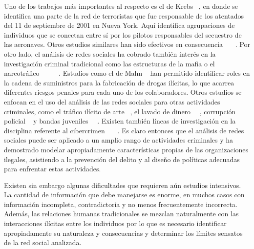 Uno de los trabajos más importantes al respecto es el de Krebs ~\cite{krebs2002mapping}, en donde se identifica una parte de la red de terroristas que fue responsable de los atentados del 11 de septiembre de 2001 en Nueva York. Aquí identifica agrupaciones de individuos que se conectan entre sí por los pilotos responsables del secuestro de las aeronaves. Otros estudios similares han sido efectivos en consecuencia ~\cite{medina2014social}~\cite{qin2005analyzing}~\cite{stollenwerk2016taking}.  Por otro lado, el análisis de redes sociales ha cobrado también interés en la investigación criminal tradicional como las estructuras de la mafia o el narcotráfico ~\cite{bouchard2013advances}~\cite{bright2015use}~\cite{giommoni2017illicit}~\cite{morselli2009hells}~\cite{morselli2010assessing}. Estudios como el de Malm ~\cite{malm2011networks} han permitido identificar roles en la cadena de suministros para la fabricación de drogas ilícitas, lo que acarrea diferentes riesgos penales para cada uno de los colaboradores. Otros estudios se enfocan en el uso del análisis de las redes sociales para otras actividades criminales, como el tráfico ilícito de arte ~\cite{bichler2013small}, el lavado de dinero ~\cite{colladon2017using}~\cite{soudijn2014using}, corrupción policial ~\cite{lauchs2011corrupt} y bandas juveniles ~\cite{mcgloin2005policy}~\cite{bichler2014magnetic}. Existen también líneas de investigación en la disciplina referente al cibercrimen ~\cite{decary2014information}~\cite{decary2012social}~\cite{decary2013reputation}. Es claro entonces que el análisis de redes sociales puede ser aplicado a un amplio rango de actividades criminales y ha demostrado modelar apropiadamente características propias de las organizaciones ilegales, asistiendo a la prevención del delito y al diseño de políticas adecuadas para enfrentar estas actividades.

Existen sin embargo algunas dificultades que requieren aún estudios intensivos. La cantidad de información que debe manejarse es enorme, en muchos casos con información incompleta, contradictoria y no menos frecuentemente incorrecta. Además, las relaciones humanas tradicionales se mezclan naturalmente con las interacciones ilícitas entre los individuos por lo que es necesario identificar apropiadamente su naturaleza y consecuencias y determinar los límites sensatos de la red social analizada. 

